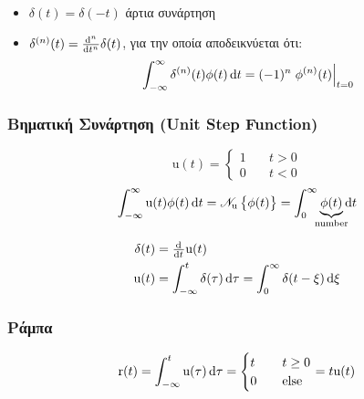 \documentclass[11pt,a4paper,titlepage,fleqn]{article}
\begin{document}
    \paragraph{}

    \begin{itemize}
    	\item \( \delta(t)=\delta(-t) \) άρτια συνάρτηση
    	\item \( \delta^{(n)}(t) = \od[n]{}{t}\delta(t) \), για την οποία
    αποδεικνύεται ότι:
        \[
            \int_{-\infty}^{\infty} \delta^{(n)}(t)\phi(t)\dif t
            = (-1)^n\left.\phi^{(n)}(t)\right|_{t=0}
        \]
    \end{itemize}

    \subsubsection{Βηματική Συνάρτηση (Unit Step Function)}
    \[
    \mathrm u(t) = \begin{cases}
    1 \quad & t > 0 \\
    0 \quad & t < 0
    \end{cases}
    \]
    \[
    \int_{-\infty}^{\infty} \mathrm u(t)\phi(t)\dif t =
    \mathscr N_{\mathrm u}\left\lbrace \phi(t) \right\rbrace =
    \int_0^\infty \underbrace{\phi(t)}_{\mathclap{\text{number}}}\dif t
    \]

    \begin{align*}
    \delta(t) &= \od{}{t} \mathrm u(t)\\
    \mathrm u(t) &= \int_{-\infty}^t \delta(\tau)\dif\tau =
    \int_0^\infty \delta(t-\xi)\dif\xi
    \end{align*}

    \subsubsection{Ράμπα}
    \[
    \mathrm r(t) = \int_{-\infty}^t \mathrm u(\tau)\dif\tau =
    \begin{cases}
    t \quad & t \geq0 \\
    0 \quad & \text{else}
    \end{cases} = t\mathrm u(t)
    \]
\end{document}

